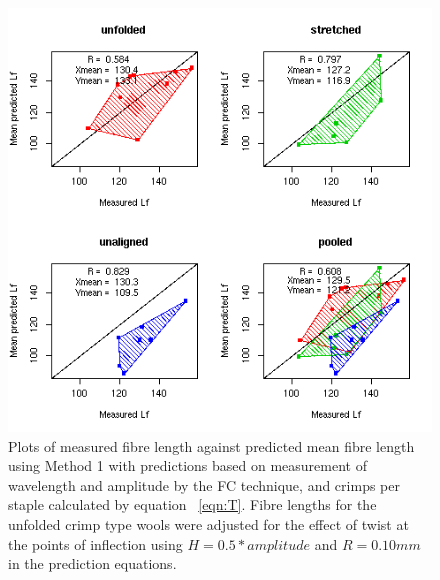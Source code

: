 %

\begin{figure}[!h]
  \centering
  \includegraphics[width=1.1\textwidth]{figfcpredlftc.png}
  \caption{Plots of measured fibre length against predicted mean fibre length using Method 1 with predictions based on measurement of wavelength and amplitude by the FC technique, and crimps per staple calculated by equation ~\ref{eqn:T}. Fibre lengths for the unfolded crimp type wools were adjusted for the effect of twist at the points of inflection using $H = 0.5 * amplitude$ and $R = 0.10 mm$ in the prediction equations.}
  \label{fig:fcpredlftc}
\end{figure}

%

